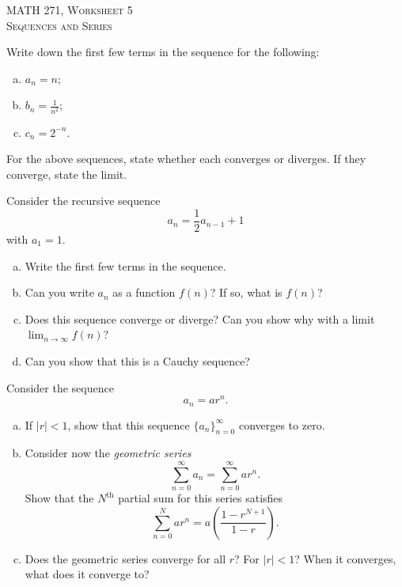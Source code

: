 \documentclass[12pt]{article} %
\begin{document}
\begin{center}
   \textsc{\large MATH 271, Worksheet 5}\\
   \textsc{Sequences and Series}
\end{center}
\vspace{.5cm}

\begin{problem}
Write down the first few terms in the sequence for the following:
\begin{enumerate}[(a)]
    \item $a_n = n$;
    \item $b_n = \frac{1}{n^2}$;
    \item $c_n = 2^{-n}$.
\end{enumerate}
\end{problem}

\begin{problem}
For the above sequences, state whether each converges or diverges.  If they converge, state the limit.
\end{problem}

\begin{problem}
Consider the recursive sequence
\[
a_n = \frac{1}{2} a_{n-1} + 1
\]
with $a_1 = 1$.  
\begin{enumerate}[(a)]
    \item Write the first few terms in the sequence.
    \item Can you write $a_n$ as a function $f(n)$? If so, what is $f(n)$?
    \item Does this sequence converge or diverge? Can you show why with a limit $\lim_{n\to \infty} f(n)$?
    \item Can you show that this is a Cauchy sequence?
\end{enumerate}
\end{problem}

\begin{problem}
Consider the sequence
\[
a_n = a r^n.
\]
\begin{enumerate}[(a)]
    \item If $|r|<1$, show that this sequence $\{a_n\}_{n=0}^\infty$ converges to zero.
    \item Consider now the \emph{geometric series}
    \[
    \sum_{n=0}^\infty a_n = \sum_{n=0}^\infty ar^n.
    \]
    Show that the $N^\textrm{th}$ partial sum for this series satisfies
    \[
    \sum_{n=0}^N ar^n = a\left( \frac{1-r^{N+1}}{1-r}\right).
    \]
    \item Does the geometric series converge for all $r$? For $|r|<1$? When it converges, what does it converge to?
\end{enumerate}
\end{problem}
\end{document}
